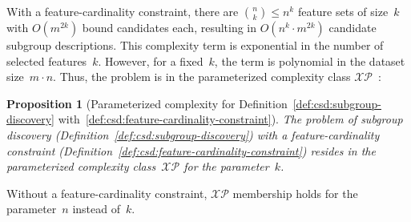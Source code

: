 \documentclass[acmsmall]{acmart} %
\theoremstyle{acmplain}
\newtheorem{proposition}{Proposition}
\theoremstyle{acmdefinition}
\begin{document}
With a feature-cardinality constraint, there are $\binom{n}{k} \leq n^k$ feature sets of size~$k$ with $O(m^{2k})$ bound candidates each, resulting in $O(n^k \cdot m^{2k})$ candidate subgroup descriptions.
This complexity term is exponential in the number of selected features~$k$.
However, for a fixed~$k$, the term is polynomial in the dataset size~$m \cdot n$.
Thus, the problem is in the parameterized complexity class $\mathcal{XP}$~\cite{downey1997parameterized}:
%
\begin{proposition}[Parameterized complexity for Definition~\ref{def:csd:subgroup-discovery} with~\ref{def:csd:feature-cardinality-constraint}]
	The problem of subgroup discovery (Definition~\ref{def:csd:subgroup-discovery}) with a feature-cardinality constraint (Definition~\ref{def:csd:feature-cardinality-constraint}) resides in the parameterized complexity class~$\mathcal{XP}$ for the parameter~$k$.
	\label{prop:csd:complexity-cardinality-xp}
\end{proposition}
%
Without a feature-cardinality constraint, $\mathcal{XP}$ membership holds for the parameter~$n$ instead of~$k$.
\end{document}
